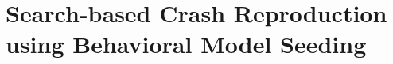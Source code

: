 \chapter{Search-based Crash Reproduction using Behavioral Model Seeding}
\label{sec:model_seeding}










